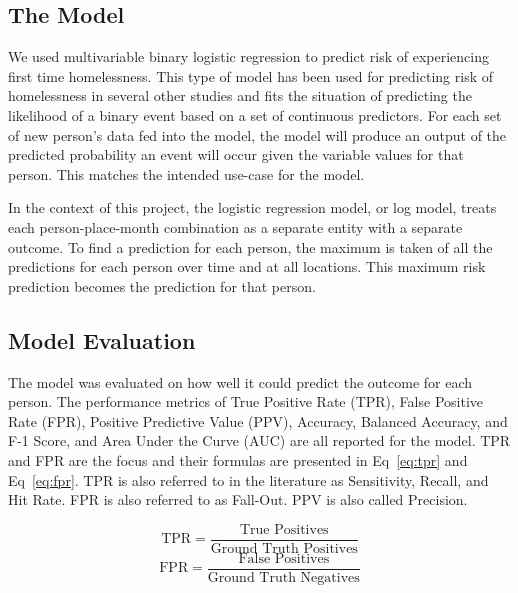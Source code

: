 \documentclass[10pt,letterpaper]{article}
\begin{document}
\subsection*{The Model}
We used multivariable binary logistic regression to predict risk of experiencing first time homelessness. This type of model has been used for predicting risk of homelessness in several other studies \cite{byrne2020classification, vanberlo2021interpretable, van2009longitudinal,flaming2011crisis, hong2018applications, toros2019early} and fits the situation of predicting the likelihood of a binary event based on a set of continuous predictors. For each set of new person's data fed into the model, the model will produce an output of the predicted probability an event will occur given the variable values for that person. This matches the intended use-case for the model. 

In the context of this project, the logistic regression model, or log model, treats each person-place-month combination as a separate entity with a separate outcome. To find a prediction for each person, the maximum is taken of all the predictions for each person over time and at all locations. This maximum risk prediction becomes the prediction for that person.

\subsection*{Model Evaluation}
The model was evaluated on how well it could predict the outcome for each person. The performance metrics of True Positive Rate (TPR), False Positive Rate (FPR), Positive Predictive Value (PPV), Accuracy, Balanced Accuracy, and F-1 Score, and Area Under the Curve (AUC) are all reported for the model. TPR and FPR are the focus and their formulas are presented in Eq~\ref{eq:tpr} and Eq~\ref{eq:fpr}. TPR is also referred to in the literature as Sensitivity, Recall, and Hit Rate. FPR is also referred to as Fall-Out. PPV is also called Precision. 

\begin{multicols}{2}
    \begin{equation}
        \text{TPR} = \frac{\text{True Positives}}{\text{Ground Truth Positives}}
        \label{eq:tpr}
    \end{equation}\break
    \begin{equation}
        \text{FPR} = \frac{\text{False Positives}}{\text{Ground Truth Negatives}}
        \label{eq:fpr}
    \end{equation}
\end{multicols}
\end{document}
